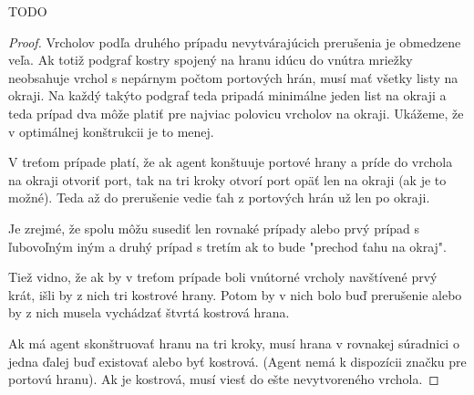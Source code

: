 TODO
\iffalse
\begin{proof}
Vrcholov podľa druhého prípadu nevytvárajúcich prerušenia je obmedzene veľa.
Ak totiž podgraf kostry spojený na hranu idúcu do vnútra mriežky neobsahuje
vrchol s nepárnym počtom portových hrán, musí mať všetky listy na okraji.
Na každý takýto podgraf teda pripadá minimálne jeden list na okraji a teda
prípad dva môže platiť pre najviac polovicu vrcholov na okraji. Ukážeme, že
v optimálnej konštrukcii je to menej.

V treťom prípade platí, že ak agent konštuuje portové hrany a príde do
vrchola na okraji otvoriť port, tak na tri kroky otvorí port opäť len na
okraji (ak je to možné). Teda až do prerušenie vedie ťah z portových hrán už
len po okraji.

Je zrejmé, že spolu môžu susediť len rovnaké prípady alebo prvý prípad s
ľubovoľným iným a druhý prípad s tretím ak to bude "prechod ťahu na okraj".

Tiež vidno, že ak by v treťom prípade boli vnútorné vrcholy navštívené prvý
krát, išli by z nich tri kostrové hrany. Potom by v nich bolo buď prerušenie
alebo by z nich musela vychádzať štvrtá kostrová hrana.

Ak má agent skonštruovať hranu na tri kroky, musí hrana v rovnakej súradnici
o jedna ďalej buď existovať alebo byť kostrová. (Agent nemá k dispozícii
značku pre portovú hranu). Ak je kostrová, musí viesť do ešte nevytvoreného
vrchola.




\end{proof}
